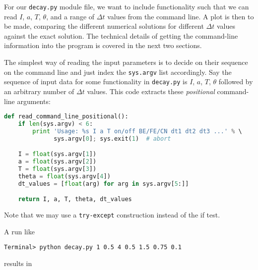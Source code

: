 \documentclass[graybox,sectrefs,envcountresetchap,open=right,final]{svmonodo}
\begin{document}

For our \texttt{decay.py} module file, we want to include functionality such
that we can read $I$, $a$, $T$, $\theta$, and a range of $\Delta t$
values from the command line.  A plot is then to be made, comparing
the different numerical solutions for different $\Delta t$ values
against the exact solution. The technical details of getting the
command-line information into the program is covered in the next
two sections.

The simplest way of reading the input parameters is to
decide on their sequence on the command line and just index
the \texttt{sys.argv} list accordingly.
Say the sequence of input data for some functionality in
\texttt{decay.py} is $I$, $a$, $T$, $\theta$ followed by an
arbitrary number of $\Delta t$ values. This code extracts
these \emph{positional} command-line arguments:














\begin{lstlisting}[language=python,style=blue1_bluegreen]
def read_command_line_positional():
    if len(sys.argv) < 6:
        print 'Usage: %s I a T on/off BE/FE/CN dt1 dt2 dt3 ...' % \ 
              sys.argv[0]; sys.exit(1)  # abort

    I = float(sys.argv[1])
    a = float(sys.argv[2])
    T = float(sys.argv[3])
    theta = float(sys.argv[4])
    dt_values = [float(arg) for arg in sys.argv[5:]]

    return I, a, T, theta, dt_values

\end{lstlisting}

Note that we may use a \texttt{try-except} construction instead of the if test.

A run like



\begin{Verbatim}[frame=lines,label=\fbox{{\tiny Terminal}},framesep=2.5mm,framerule=0.7pt,fontsize=\fontsize{9pt}{9pt}]
Terminal> python decay.py 1 0.5 4 0.5 1.5 0.75 0.1

\end{Verbatim}

results in
\end{document}
